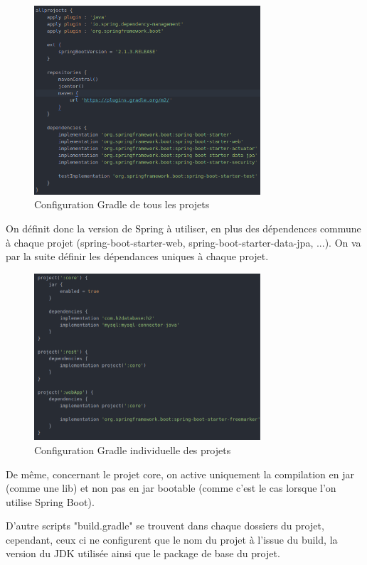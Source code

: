 			\begin{figure}[H]
				\centering\includegraphics[width=0.75\textwidth, keepaspectratio]{res/gradle_allprojects.png}
				\caption{Configuration Gradle de tous les projets}
			\end{figure}

			On définit donc la version de Spring à utiliser, en plus des dépendences commune à chaque projet (spring-boot-starter-web, spring-boot-starter-data-jpa, ...). On va par la suite définir les dépendances uniques à chaque projet.

			\begin{figure}[H]
				\centering\includegraphics[width=0.75\textwidth, keepaspectratio]{res/gradle_project.png}
				\caption{Configuration Gradle individuelle des projets}
			\end{figure}

			De même, concernant le projet core, on active uniquement la compilation en jar (comme une lib) et non pas en jar bootable (comme c'est le cas lorsque l'on utilise Spring Boot).

			D'autre scripts "build.gradle" se trouvent dans chaque dossiers du projet, cependant, ceux ci ne configurent que le nom du projet à l'issue du build, la version du JDK utilisée ainsi que le package de base du projet.
